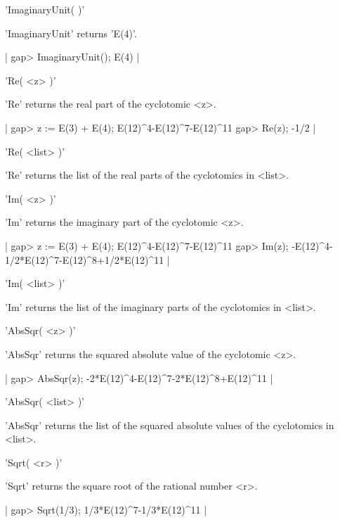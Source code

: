 
'ImaginaryUnit( )'

'ImaginaryUnit' returns 'E(4)'.

|    gap> ImaginaryUnit();
    E(4) |


'Re( <z> )'

'Re' returns the real part of the cyclotomic <z>.

|    gap> z := E(3) + E(4);
    E(12)^4-E(12)^7-E(12)^11
    gap> Re(z);
    -1/2 |

'Re( <list> )'

'Re' returns the list of the real parts of the cyclotomics
in <list>.


'Im( <z> )'

'Im' returns the imaginary part of the cyclotomic <z>.

|    gap> z := E(3) + E(4);
    E(12)^4-E(12)^7-E(12)^11
    gap> Im(z);
    -E(12)^4-1/2*E(12)^7-E(12)^8+1/2*E(12)^11 |

'Im( <list> )'

'Im' returns the list of the imaginary parts of the cyclotomics
in <list>.


'AbsSqr( <z> )'

'AbsSqr' returns the squared absolute value of the cyclotomic <z>.

|    gap> AbsSqr(z);
    -2*E(12)^4-E(12)^7-2*E(12)^8+E(12)^11 |

'AbsSqr( <list> )'

'AbsSqr' returns the list of the squared absolute values 
of the cyclotomics in <list>.


'Sqrt( <r> )'

'Sqrt' returns the square root of the rational number <r>.

|    gap> Sqrt(1/3);
    1/3*E(12)^7-1/3*E(12)^11 |


